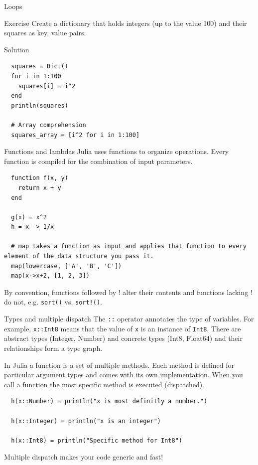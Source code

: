 \documentclass{beamer}
\begin{document}
\begin{frame}[fragile]{Loops}
\begin{block}{Exercise}
	Create a dictionary that holds integers (up to the value 100) and their squares as key, value pairs.
\end{block}
\vfill
\begin{block}{Solution}
	\begin{lstlisting}
  squares = Dict()
  for i in 1:100
    squares[i] = i^2
  end
  println(squares)
  
  # Array comprehension
  squares_array = [i^2 for i in 1:100]
	\end{lstlisting}
\end{block}
\end{frame}



\begin{frame}[fragile]{Functions and lambdas}
  Julia uses functions to organize operations. Every function is compiled for the combination of input parameters.
  \begin{lstlisting}
  function f(x, y)
    return x + y
  end

  g(x) = x^2
  h = x -> 1/x
  
  # map takes a function as input and applies that function to every element of the data structure you pass it.
  map(lowercase, ['A', 'B', 'C'])
  map(x->x+2, [1, 2, 3])
  \end{lstlisting}
By convention, functions followed by ! alter their contents and functions lacking ! do not, e.g. \verb|sort()| vs. \verb|sort!()|.
\end{frame}

\begin{frame}[fragile]{Types and multiple dispatch}
	The \verb|::| operator annotates the type of variables. For example, \verb|x::Int8| means that the value of \verb|x| is an instance of \verb|Int8|. There are abstract types (Integer, Number) and concrete types (Int8, Float64) and their relationships form a type graph.
	\vspace*{5mm}
	
	In Julia a function is a set of multiple methods. Each method is defined for particular argument types and comes with its own implementation. When you call a function the most specific method is executed (dispatched).
	\begin{lstlisting}
  h(x::Number) = println("x is most definitly a number.")

  h(x::Integer) = println("x is an integer")
  
  h(x::Int8) = println("Specific method for Int8")
	\end{lstlisting}
Multiple dispatch makes your code generic and fast!
\end{frame}
\end{document}
